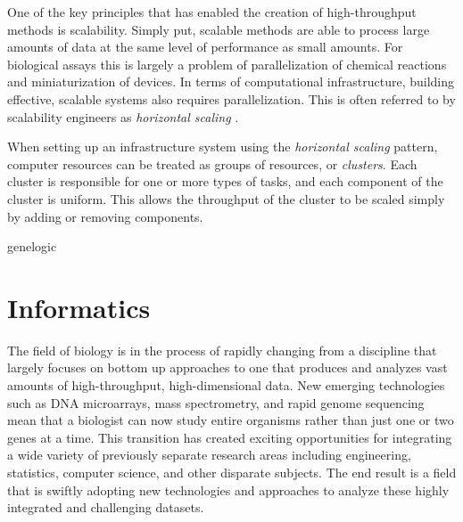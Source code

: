 One of the key principles that has enabled the creation of high-throughput
methods is scalability.  Simply put, scalable methods are able to process large
amounts of data at the same level of performance as small amounts.  For
biological assays this is largely a problem of parallelization of chemical
reactions and miniaturization of devices.  In terms of computational
infrastructure, building effective, scalable systems also requires
parallelization.  This is often referred to by scalability engineers as
\emph{horizontal scaling} \cite{schlossnagle2006,arlitt2001}.

When setting up an infrastructure system using the \emph{horizontal scaling}
pattern, computer resources can be treated as groups of resources, or
\emph{clusters}.  Each cluster is responsible for one or more types of tasks,
and each component of the cluster is uniform.  This allows the throughput of
the cluster to be scaled simply by adding or removing components.

genelogic		\cite{genelogic}

\section{Informatics}
The field of biology is in the process of rapidly changing from a discipline
that largely focuses on bottom up approaches to one that produces and analyzes
vast amounts of high-throughput, high-dimensional data. New emerging
technologies such as DNA microarrays, mass spectrometry, and rapid genome
sequencing mean that a biologist can now study entire organisms rather than just
one or two genes at a time.  This transition has created exciting opportunities
for integrating a wide variety of previously separate research areas including
engineering, statistics, computer science, and other disparate subjects.  The
end result is a field that is swiftly adopting new technologies and approaches
to analyze these highly integrated and challenging datasets. 

